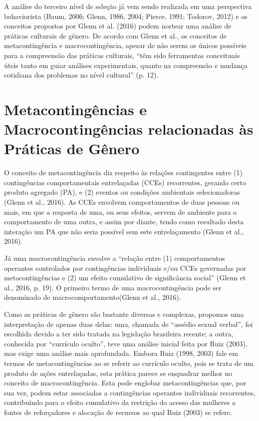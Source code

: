 A análise do terceiro nível de seleção já vem sendo realizada em uma perspectiva behaviorista (Baum, 2006; Glenn, 1986, 2004; Pierce, 1991; Todorov, 2012) e os conceitos propostos por Glenn et al. (2016) podem nortear uma análise de práticas culturais de gênero. De acordo com Glenn et al., os conceitos de metacontingência e macrocontingência, apesar de não serem os únicos possíveis para a compreensão das práticas culturais, “têm sido ferramentas conceituais úteis tanto em guiar análises experimentais, quanto na compreensão e mudança cotidiana dos problemas no nível cultural” (p. 12).

\section{Metacontingências e Macrocontingências relacionadas às Práticas de Gênero}

O conceito de metacontingência diz respeito às relações contingentes entre (1) contingências comportamentais entrelaçadas (CCEs) recorrentes, gerando certo produto agregado (PA), e (2) eventos ou condições ambientais selecionadoras (Glenn et al., 2016). As CCEs envolvem comportamentos de duas pessoas ou mais, em que a resposta de uma, ou seus efeitos, servem de ambiente para o comportamento de uma outra, e assim por diante, tendo como resultado desta interação um PA que não seria possível sem este entrelaçamento (Glenn et al., 2016). 

Já uma macrocontingência envolve a “relação entre (1) comportamentos operantes controlados por contingências individuais e/ou CCEs governadas por metacontingências e (2) um efeito cumulativo de significância social” (Glenn et al., 2016, p. 19). O primeiro termo de uma macrocontingência pode ser denominado de macrocomportamento\linebreak (Glenn et al., 2016). 

Como as práticas de gênero são bastante diversas e complexas, propomos uma interpretação de apenas duas delas: uma, chamada de “assédio sexual verbal”, foi escolhida devido a ter sido tratada na legislação brasileira recente; a outra, conhecida por “currículo oculto”, teve uma análise inicial feita por Ruiz (2003), mas exige uma análise mais aprofundada. Embora Ruiz (1998, 2003) fale em termos de metacontingências ao se referir ao currículo oculto, pois se trata de um produto de ações entrelaçadas, esta prática parece se enquadrar melhor no conceito de macrocontingência. Esta pode englobar metacontingências que, por sua vez, podem estar associadas a contingências operantes individuais recorrentes, contribuindo para o efeito cumulativo da restrição do acesso das mulheres a fontes de reforçadores e alocação de recursos ao qual Ruiz (2003) se refere.

